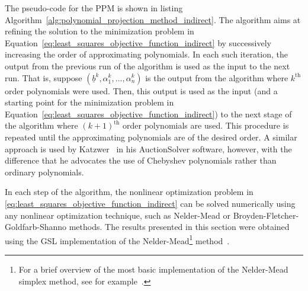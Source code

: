 The pseudo-code for the PPM is shown in listing Algorithm~\ref{alg:polynomial_projection_method_indirect}. The algorithm aims at refining the solution to the minimization problem in Equation~\eqref{eq:least_squares_objective_function_indirect} by successively increasing the order of approximating polynomials. In each such iteration, the output from the previous run of the algorithm is used as the input to the next run. That is, suppose $(\underline{b}^k, \alpha_1^k, \dotsc, \alpha_n^k)$ is the output from the algorithm where $k^\textrm{th}$ order polynomials were used. Then, this output is used as the input (and a starting point for the minimization problem in Equation~\eqref{eq:least_squares_objective_function_indirect}) to the next stage of the algorithm where $(k+1)^\textrm{th}$ order polynomials are used. This procedure is repeated until the approximating polynomials are of the desired order. A similar approach is used by Katzwer~\cite{Katzwer2012} in his AuctionSolver software, however, with the difference that he advocates the use of Chebyshev polynomials rather than ordinary polynomials.

In each step of the algorithm, the nonlinear optimization problem in \eqref{eq:least_squares_objective_function_indirect} can be solved numerically using any nonlinear optimization technique, such as Nelder-Mead or Broyden-Fletcher-Goldfarb-Shanno methods. The results presented in this section were obtained using the GSL implementation of the Nelder-Mead\footnote{For a brief overview of the most basic implementation of the Nelder-Mead simplex method, see for example~\cite{KonkaNMSimplex2013}.} method~\cite{GSL}.

